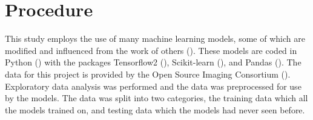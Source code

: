 \documentclass[12pt]{article}
\begin{document}


\section{Procedure}

This study employs the use of many machine learning models, some of which are modified and influenced from the work of others (\cite{kaggle}).
These models are coded in Python (\cite{10.5555/1593511}) with the packages Tensorflow2 (\cite{tensorflow2015-whitepaper}), Scikit-learn (\cite{scikit-learn}), and Pandas (\cite{mckinney2010data}).
The data for this project is provided by the Open Source Imaging Consortium (\cite{kaggle}).
Exploratory data analysis was performed and the data was preprocessed for use by the models.
The data was split into two categories, the training data which all the models trained on, and testing data which the models had never seen before.


\end{document}

